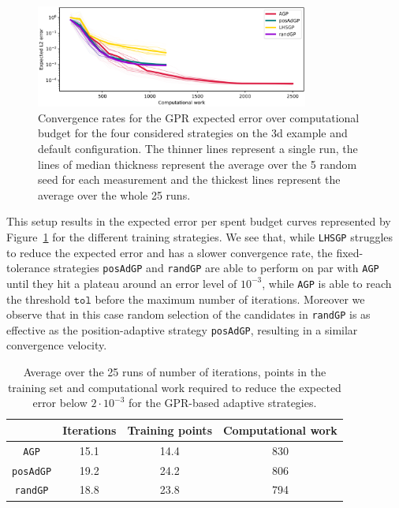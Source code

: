 \begin{figure}[H]
\begin{center}
    \includegraphics[width=0.8\textwidth]{results/pictures/d3/GP_res.png}
\end{center}
\caption{Convergence rates for the GPR expected error over computational budget for the four considered strategies on the 3d example and default configuration. The thinner lines represent a single run, the lines of median thickness represent the average over the 5 random seed for each measurement and the thickest lines represent the average over the whole 25 runs.}
\label{fig:3dGPconv}
\end{figure}

This setup results in the expected error per spent budget curves represented by Figure~\ref{fig:3dGPconv} for the different training strategies.
We see that, while \texttt{LHSGP} struggles to reduce the expected error and has a slower convergence rate, the fixed-tolerance strategies \texttt{posAdGP} and \texttt{randGP} are able to perform on par with \texttt{AGP} until they hit a plateau around an error level of $10^{-3}$, while \texttt{AGP} is able to reach the threshold $\texttt{tol}$ before the maximum number of iterations.
Moreover we observe that in this case random selection of the candidates in \texttt{randGP} is as effective as the position-adaptive strategy \texttt{posAdGP}, resulting in a similar convergence velocity.

\begin{table}[H]
    \begin{centering}
    \begin{tabular}{cccc}
    \toprule
         & Iterations & Training points & Computational work \\
         \midrule
         \texttt{AGP} 
         & 15.1 & 14.4 & 830 \\
         \texttt{posAdGP} 
         & 19.2 & 24.2 & 806 \\
         \texttt{randGP} 
         & 18.8 & 23.8 & 794  \\
         \bottomrule
    \end{tabular}
    \caption{Average over the 25 runs of number of iterations, points in the training set and computational work required to reduce the expected error below $2 \cdot 10^{-3}$ for the GPR-based adaptive strategies.}
    \label{tab:3dGP-plateau}
\end{centering}
\end{table}

